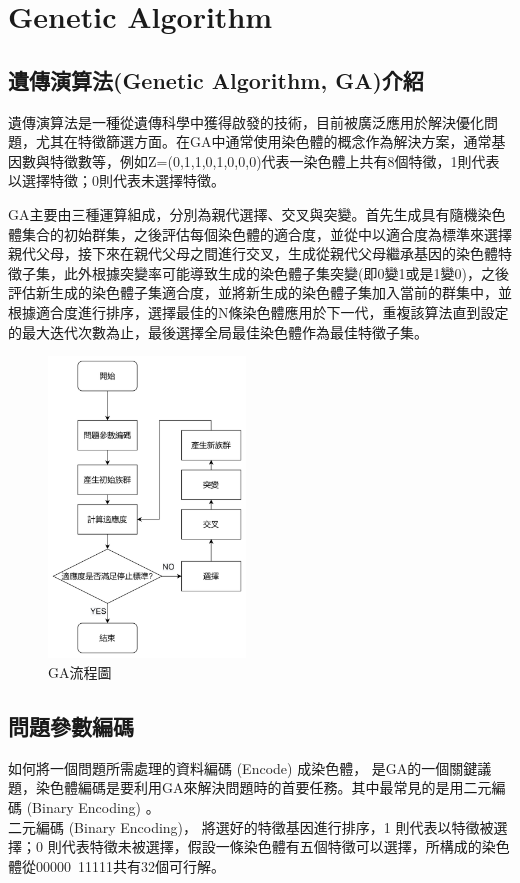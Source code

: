 \chapter{Genetic Algorithm}
\label{chapter:intro}
\section{遺傳演算法(Genetic Algorithm, GA)介紹}
遺傳演算法是一種從遺傳科學中獲得啟發的技術，目前被廣泛應用於解決優化問題，尤其在特徵篩選方面。在GA中通常使用染色體的概念作為解決方案，通常基因數與特徵數等，例如Z=(0,1,1,0,1,0,0,0)代表一染色體上共有8個特徵，1則代表以選擇特徵；0則代表未選擇特徵。

GA主要由三種運算組成，分別為親代選擇、交叉與突變。首先生成具有隨機染色體集合的初始群集，之後評估每個染色體的適合度，並從中以適合度為標準來選擇親代父母，接下來在親代父母之間進行交叉，生成從親代父母繼承基因的染色體特徵子集，此外根據突變率可能導致生成的染色體子集突變(即0變1或是1變0)，之後評估新生成的染色體子集適合度，並將新生成的染色體子集加入當前的群集中，並根據適合度進行排序，選擇最佳的N條染色體應用於下一代，重複該算法直到設定的最大迭代次數為止，最後選擇全局最佳染色體作為最佳特徵子集。
\begin{figure}[H]
	\centerline{\includegraphics[height=8cm]{pic/GAFlowChart.PNG}}
	\caption{GA流程圖}
	\label{fig:GAFlowChart}
\end{figure}

\label{sec:background}
\section{問題參數編碼}
如何將一個問題所需處理的資料編碼 (Encode) 成染色體，
是GA的一個關鍵議題，染色體編碼是要利用GA來解決問題時的首要任務。其中最常見的是用二元編碼 (Binary Encoding) 。\\
二元編碼 (Binary Encoding)，
將選好的特徵基因進行排序，1 則代表以特徵被選擇；0 則代表特徵未被選擇，假設一條染色體有五個特徵可以選擇，所構成的染色體從00000~11111共有32個可行解。



